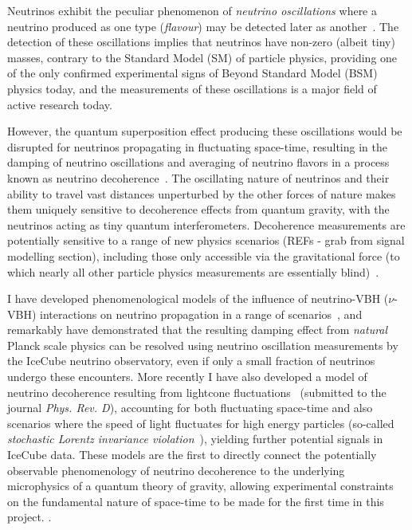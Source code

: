 \documentclass[a4paper,11pt]{article}
\begin{document}
Neutrinos exhibit the peculiar phenomenon of \textit{neutrino oscillations} where a neutrino produced as one type (\textit{flavour}) may be detected later as another~\cite{Fukuda:1998mi, Ahmad:2001an,Ahmad:2002jz}. The detection of these oscillations implies that neutrinos have non-zero (albeit tiny) masses, contrary to the Standard Model (SM) of particle physics, providing one of the only confirmed experimental signs of Beyond Standard Model (BSM) physics today, and the measurements of these oscillations is a major field of active research today.

However, the quantum superposition effect producing these oscillations would be disrupted for neutrinos propagating in fluctuating space-time, resulting in the damping of neutrino oscillations and averaging of neutrino flavors in a process known as neutrino decoherence~\cite{Benatti_2000, PhysRevLett.85.1166}. The oscillating nature of neutrinos and their ability to travel vast distances unperturbed by the other forces of nature makes them uniquely sensitive to decoherence effects from quantum gravity, with the neutrinos acting as tiny quantum interferometers. Decoherence measurements are potentially sensitive to a range of new physics scenarios (REFs - grab from signal modelling section), including those only accessible via the gravitational force (to which nearly all other particle physics measurements are essentially blind)~\cite{Hellmann:2021jyz}.

I have developed phenomenological models of the influence of neutrino-VBH ($\nu$-VBH) interactions on neutrino propagation in a range of scenarios~\cite{PhysRevD.102.115003}, and remarkably have demonstrated that the resulting damping effect from \textit{natural} Planck scale physics can be resolved using neutrino oscillation measurements by the IceCube neutrino observatory, even if only a small fraction of neutrinos undergo these encounters. More recently I have also developed a model of neutrino decoherence resulting from lightcone fluctuations~\cite{2103.15313} (submitted to the journal \textit{Phys. Rev. D}), accounting for both fluctuating space-time and also scenarios where the speed of light fluctuates for high energy particles (so-called \textit{stochastic Lorentz invariance violation}~\cite{Vasileiou2015}), yielding further potential signals in IceCube data. These models are the first to directly connect the potentially observable phenomenology of neutrino decoherence to the underlying microphysics of a quantum theory of gravity, allowing experimental constraints on the fundamental nature of space-time to be made for the first time in this project. .
\end{document}
